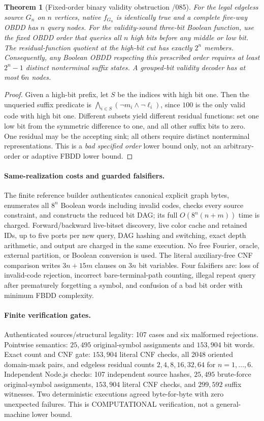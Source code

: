\documentclass[11pt]{article}
\newtheorem{theorem}{Theorem}
\begin{document}
\begin{theorem}[Fixed-order binary validity obstruction /085]
For the legal edgeless source $G_n$ on $n$ vertices, native $f_{G_n}$
is identically true and a complete five-way OBDD has $n$ query nodes.
For the validity-sound three-bit Boolean function, use the fixed OBDD
order that queries all $n$ high bits before any middle or low bit.
The residual-function quotient at the high-bit cut has exactly $2^n$
members. Consequently, any Boolean OBDD respecting this prescribed
order requires at least $2^n-1$ distinct nonterminal suffix states.
A grouped-bit validity decoder has at most $6n$ nodes.
\end{theorem}
\begin{proof}
Given a high-bit prefix, let $S$ be the indices with high bit one.
Then the unqueried suffix predicate is
$\bigwedge_{i\in S}(\neg m_i\land\neg\ell_i)$, since $100$ is the
only valid code with high bit one. Different subsets yield different
residual functions: set one low bit from the symmetric difference
to one, and all other suffix bits to zero. One residual may be
the accepting sink; all others require distinct nonterminal
representations. This is a \emph{bad specified order} lower bound
only, not an arbitrary-order or adaptive FBDD lower bound.
\end{proof}

\paragraph{Same-realization costs and guarded falsifiers.}
The finite reference builder authenticates canonical explicit graph
bytes, enumerates all $8^n$ Boolean words including invalid codes,
checks every source constraint, and constructs the reduced bit DAG;
its full $O(8^n(n+m))$ time is charged. Forward/backward live-bitset
discovery, live color cache and retained IDs, up to five ports per
new query, DAG hashing and switching, exact depth arithmetic,
and output are charged in the same execution. No free Fourier,
oracle, external partition, or Boolean conversion is used.
The literal auxiliary-free CNF comparison writes $3n+15m$ clauses
on $3n$ bit variables. Four falsifiers are: loss of invalid-code
rejection, incorrect bare-terminal-path counting, illegal repeat
query after prematurely forgetting a symbol, and confusion of a
bad bit order with minimum FBDD complexity.

\paragraph{Finite verification gates.}
Authenticated sources/structural legality: 107 cases and six
malformed rejections. Pointwise semantics: $25{,}495$ original-symbol
assignments and $153{,}904$ bit words. Exact count and CNF gate:
$153{,}904$ literal CNF checks, all 2048 oriented domain-mask pairs,
and edgeless residual counts $2,4,8,16,32,64$ for $n=1,\ldots,6$.
Independent Node.js checks: 107 independent source hashes,
$25{,}495$ brute-force original-symbol assignments,
$153{,}904$ literal CNF checks, and $299{,}592$ suffix witnesses.
Two deterministic executions agreed byte-for-byte with zero
unexpected failures. This is COMPUTATIONAL verification, not a
general-machine lower bound.
\end{document}
